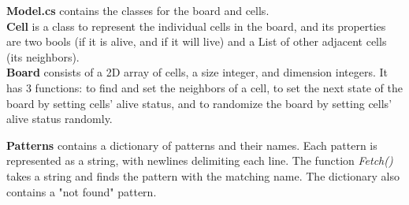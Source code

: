 \documentclass[12pt, letterpaper]{article}
\begin{document}
\textbf{Model.cs} contains the classes for the board and cells.
\\\-\hspace{0.5cm}\textbf{Cell} is a class to represent the individual cells in the board, and its properties are two bools (if it is alive, and if it will live) and a List of other adjacent cells (its neighbors).
\\\-\hspace{0.5cm}\textbf{Board} consists of a 2D array of cells, a size integer, and dimension integers. It has 3 functions: to find and set the neighbors of a cell, to set the next state of the board by setting cells' alive status, and to randomize the board by setting cells' alive status randomly.

\textbf{Patterns} contains a dictionary of patterns and their names. Each pattern is represented as a string, with newlines delimiting each line. The function \textit{Fetch()} takes a string and finds the pattern with the matching name. The dictionary also contains a "not found" pattern.
\end{document}
